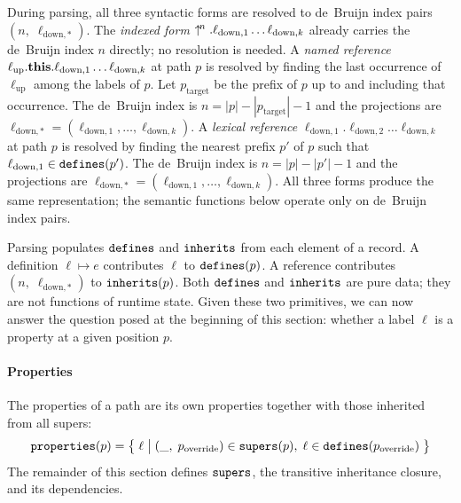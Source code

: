 During parsing, all three syntactic forms are resolved to
de~Bruijn index pairs $(n,\; \ell_{\mathrm{down},*})$.
The \emph{indexed form}
$\uparrow^{\!n}.\ell_{\mathrm{down},1}\ldots\ell_{\mathrm{down},k}$
already carries the de~Bruijn index $n$ directly;
no resolution is needed.
A \emph{named reference}
$\ell_{\mathrm{up}}.\mathbf{this}.\ell_{\mathrm{down},1}\ldots\ell_{\mathrm{down},k}$
at path $p$ is resolved by finding the last occurrence of
$\ell_{\mathrm{up}}$ among the labels of $p$.
Let $p_{\mathrm{target}}$ be the prefix of $p$ up to and including
that occurrence.
The de~Bruijn index is $n = |p| - |p_{\mathrm{target}}| - 1$
and the projections are
$\ell_{\mathrm{down},*} = (\ell_{\mathrm{down},1}, \ldots, \ell_{\mathrm{down},k})$.
A \emph{lexical reference} $\ell_{\mathrm{down},1}.\ell_{\mathrm{down},2}\ldots\ell_{\mathrm{down},k}$ at path $p$
is resolved by finding the nearest prefix $p'$ of $p$
such that $\ell_{\mathrm{down},1} \in \mathtt{defines}(p')$.
The de~Bruijn index is $n = |p| - |p'| - 1$ and the projections are
$\ell_{\mathrm{down},*} = (\ell_{\mathrm{down},1}, \ldots, \ell_{\mathrm{down},k})$.
All three forms produce the same representation; the semantic functions
below operate only on de~Bruijn index pairs.

Parsing populates $\mathtt{defines}$ and $\mathtt{inherits}$ from each
element of a record.
A definition $\ell \mapsto e$
contributes $\ell$ to $\mathtt{defines}(p)$.
A reference contributes $(n,\; \ell_{\mathrm{down},*})$ to $\mathtt{inherits}(p)$.
Both $\mathtt{defines}$ and $\mathtt{inherits}$ are pure data; they are not functions
of runtime state.
Given these two primitives, we can now answer the question
posed at the beginning of this section:
whether a label $\ell$ is a property at a given position $p$.

\paragraph{Properties}
The properties of a path are its own properties together with
those inherited from all supers:
\begin{equation}\label{eq:properties}
  \mathtt{properties}(p) =
  \bigl\{\; \ell \;\big|\;
    (\_,\; p_{\mathrm{override}}) \in \mathtt{supers}(p),\;
    \ell \in \mathtt{defines}(p_{\mathrm{override}})
  \;\bigr\}
\end{equation}
The remainder of this section defines $\mathtt{supers}$,
the transitive inheritance closure,
and its dependencies.

